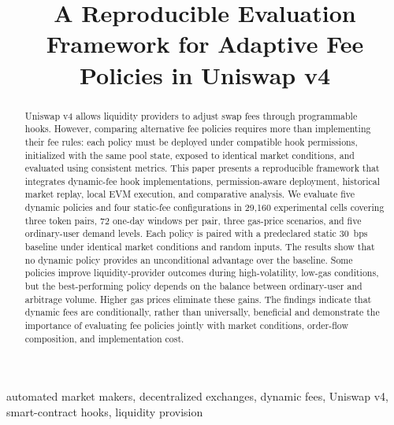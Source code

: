 \documentclass[a4paper,conference]{IEEEtran}
\begin{document}
\title{A Reproducible Evaluation Framework for Adaptive Fee Policies in Uniswap v4}


\maketitle

\begin{abstract}
  Uniswap v4 allows liquidity providers to adjust swap fees through programmable hooks. However, comparing alternative fee policies requires more than implementing their fee rules: each policy must be deployed under compatible hook permissions, initialized with the same pool state, exposed to identical market conditions, and evaluated using consistent metrics. This paper presents a reproducible framework that integrates dynamic-fee hook implementations, permission-aware deployment, historical market replay, local EVM execution, and comparative analysis. We evaluate five dynamic policies and four static-fee configurations in 29{,}160 experimental cells covering three token pairs, 72 one-day windows per pair, three gas-price scenarios, and five ordinary-user demand levels. Each policy is paired with a predeclared static 30~bps baseline under identical market conditions and random inputs. The results show that no dynamic policy provides an unconditional advantage over the baseline. Some policies improve liquidity-provider outcomes during high-volatility, low-gas conditions, but the best-performing policy depends on the balance between ordinary-user and arbitrage volume. Higher gas prices eliminate these gains. The findings indicate that dynamic fees are conditionally, rather than universally, beneficial and demonstrate the importance of evaluating fee policies jointly with market conditions, order-flow composition, and implementation cost.
\end{abstract}

\begin{IEEEkeywords}
  automated market makers, decentralized exchanges, dynamic fees, Uniswap v4, smart-contract hooks, liquidity provision
\end{IEEEkeywords}
\end{document}
